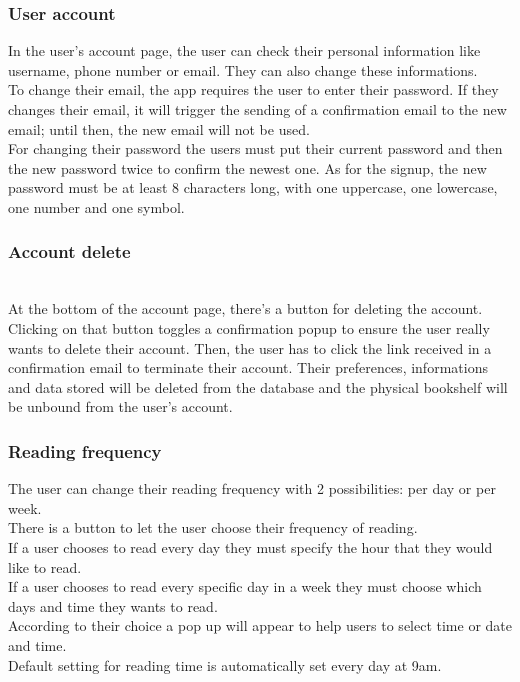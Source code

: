 \documentclass[conference]{IEEEtran}
\begin{document}
\subsubsection{User account}

In the user’s account page, the user can check their personal information like username, phone number or email. They can also change these informations.\\
To change their email, the app requires the user to enter their password. If they changes their email, it will trigger the sending of a confirmation email to the new email; until then, the new email will not be used.\\
For changing their password the users must put their current password and then the new password twice to confirm the newest one. As for the signup, the new password must be at least 8 characters long, with one uppercase, one lowercase, one number and one symbol.\\

\subsubsection{Account delete}\hfill\\
At the bottom of the account page, there's a button for deleting the account. Clicking on that button toggles a confirmation popup to ensure the user really wants to delete their account. Then, the user has to click the link received in a confirmation email to terminate their account. Their preferences, informations and data stored will be deleted from the database and the physical bookshelf will be unbound from the user's account.\\

\subsubsection{Reading frequency}\hfill

The user can change their reading frequency with 2 possibilities: per day or per week.\\
There is a button to let the user choose their frequency of reading.\\
If a user chooses to read every day they must specify the hour that they would like to read.\\
If a user chooses to read every specific day in a week they must choose which days and time they wants to read.\\
According to their choice a pop up will appear to help users to select time or date and time.\\
Default setting for reading time is automatically set every day at 9am.\\
\end{document}
